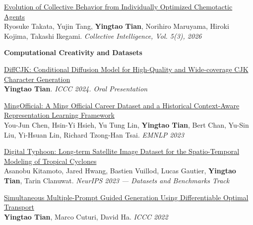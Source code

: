 \documentclass[line,margin]{cv}
\begin{document}
\begin{resume}
{  \begin{samepage}
  \href{https://journals.sagepub.com/doi/10.1177/26339137261477746}{Evolution of Collective Behavior from Individually Optimized Chemotactic Agents}\\
  Ryosuke Takata, Yujin Tang, \textbf{Yingtao Tian}, Norihiro Maruyama, Hiroki Kojima, Takashi Ikegami. \emph{Collective Intelligence, Vol. 5(3), 2026}
  \par\end{samepage}

}

\textbf{Computational Creativity and Datasets}

{\small
\setlength{\parskip}{0.5ex plus 0.1ex minus 0.1ex}

  \begin{samepage}
  \href{https://arxiv.org/abs/2404.05212}{DiffCJK: Conditional Diffusion Model for High-Quality and Wide-coverage CJK Character Generation}\\
  \textbf{Yingtao Tian}. \emph{ICCC 2024. Oral Presentation}
  \par\end{samepage}

  \begin{samepage}
  \href{https://aclanthology.org/2023.emnlp-main.266/}{MingOfficial: A Ming Official Career Dataset and a Historical Context-Aware Representation Learning Framework}\\
  You-Jun Chen, Hsin-Yi Hsieh, Yu Tung Lin, \textbf{Yingtao Tian}, Bert Chan, Yu-Sin Liu, Yi-Hsuan Lin, Richard Tzong-Han Tsai. \emph{EMNLP 2023}
  \par\end{samepage}

  \begin{samepage}
  \href{https://arxiv.org/abs/2311.02665}{Digital Typhoon: Long-term Satellite Image Dataset for the Spatio-Temporal Modeling of Tropical Cyclones}\\
  Asanobu Kitamoto, Jared Hwang, Bastien Vuillod, Lucas Gautier, \textbf{Yingtao Tian}, Tarin Clanuwat. \emph{NeurIPS 2023 --- Datasets and Benchmarks Track}
  \par\end{samepage}

  \begin{samepage}
  \href{https://arxiv.org/abs/2204.08472}{Simultaneous Multiple-Prompt Guided Generation Using Differentiable Optimal Transport}\\
  \textbf{Yingtao Tian}, Marco Cuturi, David Ha. \emph{ICCC 2022}
  \par\end{samepage}

}
\end{resume}
\end{document}
